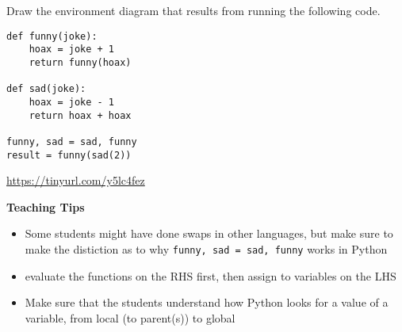 \question Draw the environment diagram that results from running the following code.

\begin{lstlisting}
def funny(joke):
    hoax = joke + 1
    return funny(hoax)

def sad(joke):
    hoax = joke - 1
    return hoax + hoax

funny, sad = sad, funny
result = funny(sad(2))
\end{lstlisting}

\begin{solution}[2in]
\url{https://tinyurl.com/y5lc4fez}
\end{solution}

\begin{guide}
    \begin{blocksection}
    \textbf{Teaching Tips}
      \begin{itemize}
        \item Some students might have done swaps in other languages, but make sure to make the distiction as to why \lstinline{funny, sad = sad, funny} works in Python
        \item evaluate the functions on the RHS first, then assign to variables on the LHS
        \item Make sure that the students understand how Python looks for a value of a variable, from local (to parent(s)) to global
      \end{itemize}
    \end{blocksection}
    \end{guide}
    